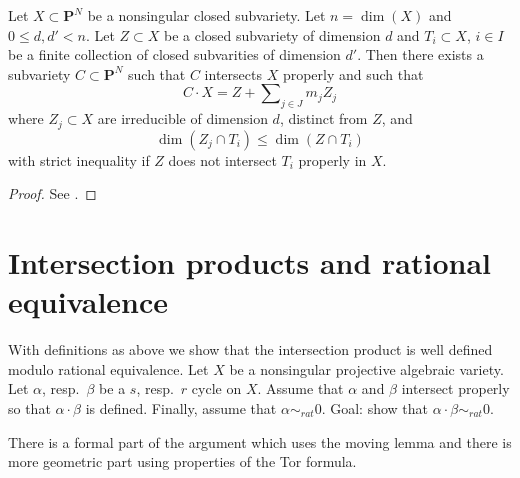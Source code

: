 \begin{lemma}
\label{lemma-moving}
Let $X \subset \mathbf{P}^N$ be a nonsingular closed subvariety.
Let $n = \dim(X)$ and $0 \leq d, d' < n$. Let $Z \subset X$ be a closed
subvariety of dimension $d$ and $T_i \subset X$, $i \in I$ be a finite
collection of closed subvarities of dimension $d'$. Then there exists
a subvariety $C \subset \mathbf{P}^N$ such that $C$ intersects $X$
properly and such that
$$
C \cdot X = Z + \sum\nolimits_{j \in J} m_j Z_j
$$
where $Z_j \subset X$ are irreducible of dimension $d$, distinct from $Z$, and 
$$
\dim(Z_j \cap T_i) \leq \dim(Z \cap T_i)
$$
with strict inequality if $Z$ does not intersect $T_i$ properly in $X$.
\end{lemma}

\begin{proof}
See \cite{Roberts}.
\end{proof}



\section{Intersection products and rational equivalence}
\label{section-intersections-and-rational-equivalence}

\noindent
With definitions as above we show that
the intersection product is well defined modulo rational
equivalence. Let $X$ be a nonsingular projective algebraic
variety. Let $\alpha$, resp.\ $\beta$ be a $s$, resp.\ $r$
cycle on $X$. Assume that $\alpha$ and $\beta$ intersect
properly so that $\alpha \cdot \beta$ is defined. Finally,
assume that $\alpha \sim_{rat} 0$. Goal: show that
$\alpha \cdot \beta \sim_{rat} 0$.

\medskip\noindent
There is a formal part of the argument which uses the moving lemma
and there is more geometric part using properties of the Tor formula.

